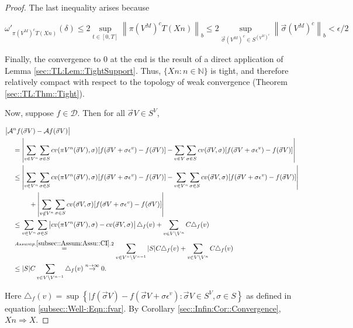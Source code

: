 \documentclass[12pt]{article}
\newcommand{\mb}{\mathbb}
\newcommand{\mc}{\mathcal}
\newcommand{\ra}{\rightarrow}
\newcommand{\os}{\overset}
\newcommand{\ep}{\epsilon}
\newcommand{\ind}{\hspace{24pt}}
\renewcommand{\v}{v}							%
\renewcommand{\S}{S}							%
\newcommand{\s}{\sigma}							%
\newcommand{\sv}{\vec{\s}}						%
\renewcommand{\b}{b}							%
\newcommand{\ev}[1]{\ep^{#1}}					%
\newcommand{\T}{T}								%
\renewcommand{\t}{t}							%
\newcommand{\proj}{\pi}							%
\newcommand{\X}{X}								%
\newcommand{\IG}{\mc{A}}						%
\newcommand{\IGr}{c}							%
\newcommand{\pup}[1]{^{#1}}							%
\newcommand{\core}{\mc{D}}							%
\newcommand{\V}{V}									%
\newcommand{\numb}{n}								%
\newcommand{\XState}[1]{\S^{#1}}				%
\newcommand{\const}[1]{C_{#1}}						%
\begin{document}
\begin{proof}
The last inequality arises because

\[\omega'_{\proj{\left(\V\pup{M}\right)^c}{\T}(\X{}{}{\numb})}(\delta) \leq 2 \sup_{\t\in [0,\T]} \left\|\proj{\left(\V\pup{M}\right)^c}{\T}(\X{}{}{\numb})\right\|_{\b{}} \leq 2 \sup_{\sv{}{\left(\V\pup{M}\right)^c} \in \S^{\left(\V\pup{M}\right)^c}} \left\|\sv{}{\left(\V\pup{M}\right)^c}\right\|_{\b{}} < \ep/2\]

Finally, the convergence to 0 at the end is the result of a direct application of Lemma \ref{sec::TL:Lem::TightSupport}. Thus, \(\{\X{}{}{\numb}:\numb\in \mb{N}\}\) is tight, and therefore relatively compact with respect to the topology of weak convergence (Theorem \ref{sec::TL:Thm::Tight}).

Now, suppose \(f\in \core\). Then for all \(\sv{}{\V} \in \S^\V\),

\begin{align*}
\big|\IG&\pup{\numb}f(\sv{}{\V}) - \IG f(\sv{}{\V})\big|\\
&= \left|\sum_{\v \in \V\pup{\numb}} \sum_{\s \in \S} \IGr{\v}(\proj{\V\pup{\numb}}{}(\sv{}{\V}),\s)[f(\sv{}{\V}+\s\ev{\v}) - f(\sv{}{\V})] - \sum_{\v \in \V}\sum_{\s \in \S} \IGr{\v}(\sv{}{\V},\s)[f(\sv{}{\V}+\s\ev{\v}) - f(\sv{}{\V})]\right|\\
&\leq  \left|\sum_{\v \in \V\pup{\numb}} \sum_{\s \in \S} \IGr{\v}(\proj{\V\pup{\numb}}{}(\sv{}{\V}),\s)[f(\sv{}{\V}+\s\ev{\v}) - f(\sv{}{\V})] - \sum_{\v \in \V\pup{\numb}}\sum_{\s \in \S} \IGr{\v}(\sv{}{\V},\s)[f(\sv{}{\V}+\s\ev{\v}) - f(\sv{}{\V})]\right|\\
&\ind  +\left|\sum_{\v \notin \V\pup{\numb}} \sum_{\s\in \S} \IGr{\v}(\sv{}{\V},\s)[f(\sv{}{\V}+\s\ev{\v}) - f(\sv{}{\V})]\right|\\
&\leq \sum_{\v \in \V\pup{\numb}}\sum_{\s \in \S} \left|\IGr{\v}(\proj{\V\pup{\numb}}{}(\sv{}{\V}),\s) - \IGr{\v}(\sv{}{\V},\s)\right|\triangle_f(\v) + \sum_{\v \in \V\setminus \V\pup{\numb}} \const{}\triangle_f(\v)\\
&\os{Assump. \ref{subsec::Assum:Assu::CI}.2}{=} \sum_{\v \in \V\pup{\numb}\setminus\V\pup{\numb-1}} |\S|\const{} \triangle_f(\v) + \sum_{\v \in \V\setminus \V\pup{\numb}} \const{}\triangle_f(\v)\\
&\leq |\S|C\sum_{\v \in \V\setminus \V\pup{\numb-1}} \triangle_f(\v) \os{n\ra\infty}{\ra} 0.
\end{align*}

Here \(\triangle_f(\v) = \sup\left\{|f(\sv{}{\V}) - f(\sv{}{\V} + \s\ev{\v}): \sv{}{\V}\in \S^\V,\s \in \S\right\}\) as defined in equation \eqref{subsec::Well-:Eqn::fvar}. By Corollary \ref{sec::Infin:Cor::Convergence}, \(\X{}{}{\numb}\Rightarrow \X{}{}\).
\end{proof}
\end{document}
